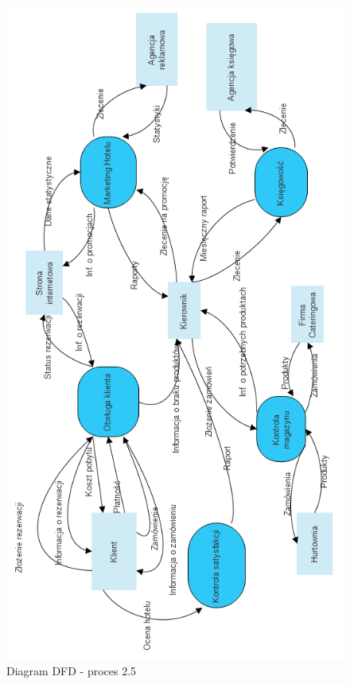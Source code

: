 \documentclass[a4paper, 11pt]{article}
\begin{document}
	\begin{figure}[H]%
			\center
			\includegraphics[scale=0.7]{Img/DFDpoziom0.png}
			\caption{Diagram DFD - proces 2.5}
	\end{figure}
\end{document}
